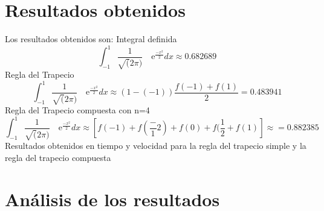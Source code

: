 \section{Resultados obtenidos}
\label{3:sec:3}
\parindent=1cm
\raggedright
Los resultados obtenidos son:
Integral definida 
\[
\int_{-1}^{1} \frac{1}{\sqrt(2\pi)} \quad\text{e}^{\frac{-x^2}{2}}dx\approx0.682689 
\]
Regla del Trapecio
\[
\int_{-1}^{1} \frac{1}{\sqrt(2\pi)} \quad\text{e}^{\frac{-x^2}{2}}dx\approx\left(1-(-1)\right)\frac{f(-1)+f(1)}{2}=0.483941
\]
Regla del Trapecio compuesta con n=4
\[
\int_{-1}^{1} \frac{1}{\sqrt(2\pi)} \quad\text{e}^{\frac{-x^2}{2}}dx\approx\left[f(-1) + f(\frac-{1}{2}) + f(0) + f(\frac{1}{2} + f(1)\right]\approx=0.882385
\]
Resultados obtenidos en tiempo y velocidad para la regla del trapecio simple y la regla del trapecio compuesta


\section{An\'alisis de los resultados}
\label{3:sec:4}
\parindent=1cm
\raggedright
 

